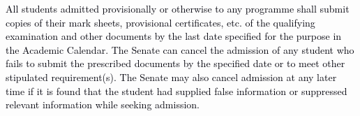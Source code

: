 \documentclass[12pt]{article}
\begin{document}
\vspace{\baselineskip}
\begin{justify}
{\fontsize{9pt}{10.8pt}\selectfont \textcolor[HTML]{00000A}{All students admitted provisionally or otherwise to any programme shall submit copies of their mark sheets, provisional certificates, etc. of the qualifying examination and other documents by the last date specified for the purpose in the Academic Calendar. The Senate can cancel the admission of any student who fails to submit the prescribed documents by the specified date or to meet other stipulated requirement(s). The Senate may also cancel admission at any later time if it is found that the student had supplied false information or suppressed relevant information while seeking admission.}\par}
\end{justify}\par


\vspace{\baselineskip}

\vspace{\baselineskip}

\vspace{\baselineskip}

\vspace{\baselineskip}

\vspace{\baselineskip}

\vspace{\baselineskip}

\vspace{\baselineskip}

\vspace{\baselineskip}

\vspace{\baselineskip}

\vspace{\baselineskip}

\vspace{\baselineskip}

\vspace{\baselineskip}

\vspace{\baselineskip}

\vspace{\baselineskip}

\vspace{\baselineskip}

\vspace{\baselineskip}
\end{document}
